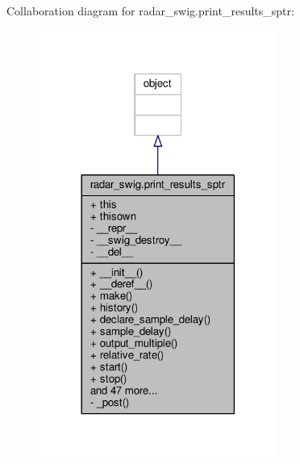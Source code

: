 Collaboration diagram for radar\+\_\+swig.\+print\+\_\+results\+\_\+sptr\+:
\nopagebreak
\begin{figure}[H]
\begin{center}
\leavevmode
\includegraphics[width=222pt]{d5/d99/classradar__swig_1_1print__results__sptr__coll__graph}
\end{center}
\end{figure}
